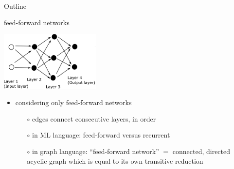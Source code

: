 \documentclass[xcolor={svgnames},
               hyperref={colorlinks,citecolor=DeepPink4,linkcolor=FireBrick,urlcolor=Maroon}]
               {beamer}
\begin{document}
\begin{frame}{Outline}
\end{frame}


\begin{frame}{feed-forward networks}

\begin{center}
\includegraphics[height=30mm]{figs/network}
\end{center}

\begin{itemize}
\item considering only \alert{feed-forward} networks
    \begin{itemize}
    \item[$\circ$] edges connect consecutive layers, in order
    \item[$\circ$] in ML language: feed-forward versus \alert{recurrent}
    \item[$\circ$] in graph language: ``feed-forward network'' $=$ connected, directed acyclic graph which is equal to its own transitive reduction
    \end{itemize}
\end{itemize}
\end{frame}
\end{document}
